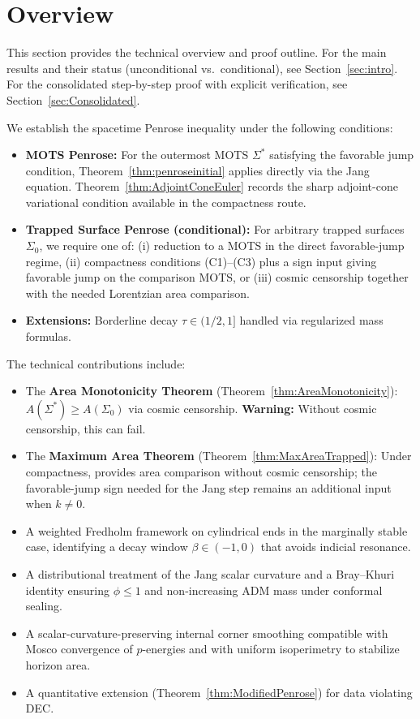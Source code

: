 \section{Overview}
\label{sec:Overview}

\begin{remark}
This section provides the technical overview and proof outline. For the main results and their status (unconditional vs.\ conditional), see Section~\ref{sec:intro}. For the consolidated step-by-step proof with explicit verification, see Section~\ref{sec:Consolidated}.
\end{remark}

\noindent
We establish the spacetime Penrose inequality under the following conditions:
\begin{itemize}
    \item \textbf{MOTS Penrose:} For the outermost MOTS $\Sigma^*$ satisfying the favorable jump condition, Theorem~\ref{thm:penroseinitial} applies directly via the Jang equation. Theorem~\ref{thm:AdjointConeEuler} records the sharp adjoint-cone variational condition available in the compactness route.
    \item \textbf{Trapped Surface Penrose (conditional):} For arbitrary trapped surfaces $\Sigma_0$, we require one of: (i) reduction to a MOTS in the direct favorable-jump regime, (ii) compactness conditions (C1)--(C3) plus a sign input giving favorable jump on the comparison MOTS, or (iii) cosmic censorship together with the needed Lorentzian area comparison.
    \item \textbf{Extensions:} Borderline decay $\tau \in (1/2, 1]$ handled via regularized mass formulas.
\end{itemize}

The technical contributions include:
\begin{itemize}
    \item The \textbf{Area Monotonicity Theorem} (Theorem~\ref{thm:AreaMonotonicity}): $A(\Sigma^*) \ge A(\Sigma_0)$ via cosmic censorship. \textbf{Warning:} Without cosmic censorship, this can fail.
    \item The \textbf{Maximum Area Theorem} (Theorem~\ref{thm:MaxAreaTrapped}): Under compactness, provides area comparison without cosmic censorship; the favorable-jump sign needed for the Jang step remains an additional input when $k\neq0$.
    \item A weighted Fredholm framework on cylindrical ends in the marginally stable case, identifying a decay window $\beta\in(-1,0)$ that avoids indicial resonance.
    \item A distributional treatment of the Jang scalar curvature and a Bray--Khuri identity ensuring $\phi\le 1$ and non-increasing ADM mass under conformal sealing.
    \item A scalar-curvature-preserving internal corner smoothing compatible with Mosco convergence of $p$-energies and with uniform isoperimetry to stabilize horizon area.
    \item A quantitative extension (Theorem~\ref{thm:ModifiedPenrose}) for data violating DEC.
\end{itemize}

